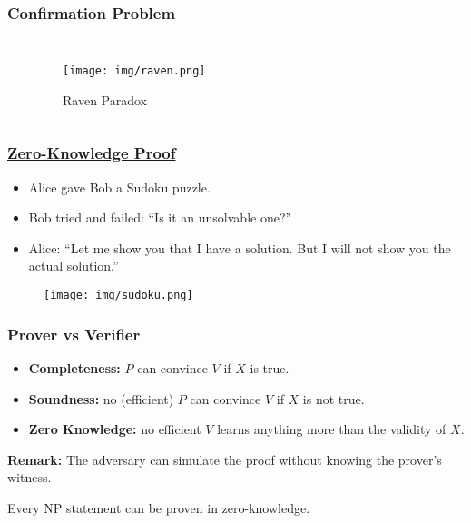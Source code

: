 \documentclass[UTF8,11pt,colorlinks,compress,openany]{beamer}%
\begin{document}
\begin{frame}\frametitle{Confirmation Problem}
\begin{columns}
	\begin{prooftree}
		\noLine
		\alwaysSingleLine
	\end{prooftree}
	\begin{figure}
		\texttt{[image: img/raven.png]}\caption{Raven Paradox}
	\end{figure}
\end{columns}
\end{frame}

\begin{frame}\frametitle{\href{https://zhuanlan.zhihu.com/p/34072069}{Zero-Knowledge Proof}}
	\begin{itemize}
		\item Alice gave Bob a Sudoku puzzle.
		\item Bob tried and failed: ``Is it an unsolvable one?''
		\item Alice: ``Let me show you that I have a solution. But I will not show you the actual solution.''
	\end{itemize}
\begin{figure}
\texttt{[image: img/sudoku.png]}
\end{figure}
\end{frame}

\begin{frame}\frametitle{Prover vs Verifier}
	\begin{itemize}
		\item \textbf{Completeness:} $P$ can convince $V$ if $X$ is true.
		\item \textbf{Soundness:} no (efficient) $P$ can convince $V$ if $X$ is not true.
		\item \textbf{Zero Knowledge:} no efficient $V$ learns anything more than the validity of $X$.
	\end{itemize}
	\textbf{Remark:} The adversary can simulate the proof without knowing the prover's witness.
	\begin{theorem}
		Every NP statement can be proven in zero-knowledge.
	\end{theorem}
\end{frame}
\end{document}
